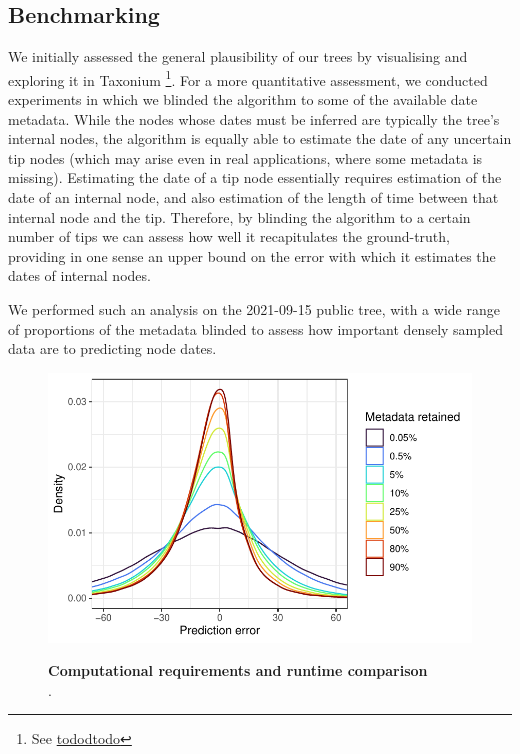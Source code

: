 \subsection*{Benchmarking}

We initially assessed the general plausibility of our trees by visualising and exploring it in Taxonium \cite{taxonium} \footnote{See \url{tododtodo}}. For a more quantitative assessment, we conducted experiments in which we blinded the algorithm to some of the available date metadata. While the nodes whose dates must be inferred are typically the tree's internal nodes, the algorithm is equally able to estimate the date of any uncertain tip nodes (which may arise even in real applications, where some metadata is missing). Estimating the date of a tip node essentially requires estimation of the date of an internal node, and also estimation of the length of time between that internal node and the tip. Therefore, by blinding the algorithm to a certain number of tips we can assess how well it recapitulates the ground-truth, providing in one sense an upper bound on the error with which it estimates the dates of internal nodes.

We performed such an analysis on the 2021-09-15 public tree, with a wide range of proportions of the metadata blinded to assess how important densely sampled data are to predicting node dates.

\begin{figure}[t!]
\centering
\includegraphics[width=0.7\linewidth]{manuscript/Figures/blinding.pdf}
\label{fig:blinding}
\caption{\textbf{Computational requirements and runtime comparison}\\
.}

\end{figure}


